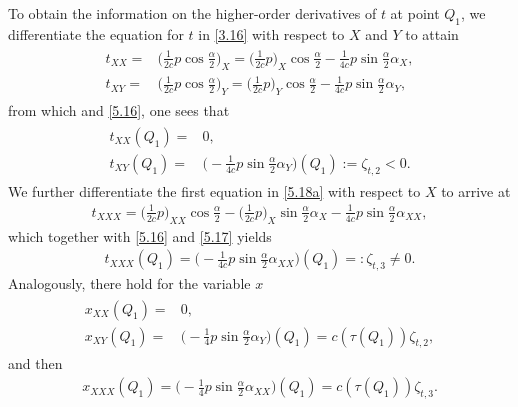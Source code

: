 \documentclass[11pt,reqno]{article}
\newcommand{\fr}{\frac}
\numberwithin{equation}{section}
\begin{document}
To obtain the information on the higher-order derivatives of $t$ at point $Q_1$, we differentiate the equation for $t$ in \eqref{3.16} with respect to $X$ and $Y$ to attain
\begin{align}\label{5.18a}
\begin{split}
t_{XX}=&\Big(\fr{1}{2c}p\cos\fr{\alpha}{2}\Big)_X =\Big(\fr{1}{2c}p\Big)_X\cos\fr{\alpha}{2} -\fr{1}{4c}p\sin\fr{\alpha}{2}\alpha_X, \\[4pt]
t_{XY}=&\Big(\fr{1}{2c}p\cos\fr{\alpha}{2}\Big)_Y =\Big(\fr{1}{2c}p\Big)_Y\cos\fr{\alpha}{2} -\fr{1}{4c}p\sin\fr{\alpha}{2}\alpha_Y,
\end{split}
\end{align}
from which and \eqref{5.16}, one sees that
\begin{align}\label{5.19}
\begin{split}
t_{XX}(Q_1)=& 0, \\[4pt]
t_{XY}(Q_1)=&\Big( -\fr{1}{4c}p\sin\fr{\alpha}{2}\alpha_Y\Big)(Q_1):=\zeta_{t,2}<0.
\end{split}
\end{align}
We further differentiate the first equation in \eqref{5.18a} with respect to $X$ to arrive at
\begin{align}\label{5.20}
t_{XXX}=\Big(\fr{1}{2c}p\Big)_{XX}\cos\fr{\alpha}{2} -\Big(\fr{1}{2c}p\Big)_X\sin\fr{\alpha}{2}\alpha_X -\fr{1}{4c}p\sin\fr{\alpha}{2}\alpha_{XX},
\end{align}
which together with \eqref{5.16} and \eqref{5.17} yields
\begin{align}\label{5.21}
t_{XXX}(Q_1)= \Big(-\fr{1}{4c}p\sin\fr{\alpha}{2}\alpha_{XX}\Big)(Q_1)=:\zeta_{t,3}\neq0.
\end{align}
Analogously, there hold for the variable $x$
\begin{align}\label{5.22a}
\begin{split}
x_{XX}(Q_1)=& 0, \\[4pt]
x_{XY}(Q_1)=&\Big( -\fr{1}{4}p\sin\fr{\alpha}{2}\alpha_Y\Big)(Q_1)=c(\tau(Q_1))\zeta_{t,2},
\end{split}
\end{align}
and then
\begin{align}\label{5.22}
x_{XXX}(Q_1)= \Big(-\fr{1}{4}p\sin\fr{\alpha}{2}\alpha_{XX}\Big)(Q_1)=c(\tau(Q_1))\zeta_{t,3}.
\end{align}
\end{document}
